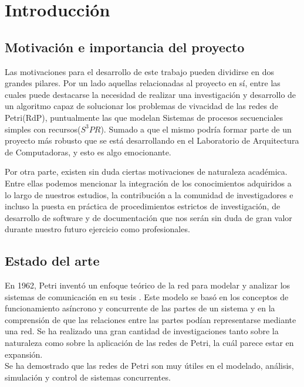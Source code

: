 
\chapter{Introducción} %

\label{Chapter1} %

\section{Motivación e importancia del proyecto}

Las motivaciones para el desarrollo de este trabajo pueden dividirse en dos grandes pilares. Por un lado aquellas relacionadas al proyecto en sí, entre las cuales puede destacarse la necesidad de realizar una investigación y desarrollo de un algoritmo capaz de solucionar los problemas de vivacidad de las redes de Petri(RdP), puntualmente las que modelan Sistemas de procesos secuenciales simples con recursos($S^3PR$). Sumado a que el mismo podría formar parte de un proyecto más robusto que se está desarrollando en el Laboratorio de Arquitectura de Computadoras, y esto es algo emocionante.
\bigskip 

Por otra parte, existen sin duda ciertas motivaciones de naturaleza académica. Entre ellas podemos mencionar la integración de los conocimientos adquiridos a lo largo de nuestros estudios, la contribución a la comunidad de investigadores e incluso la puesta en práctica de procedimientos estrictos de investigación, de desarrollo de software y de documentación que nos serán sin duda de gran valor durante nuestro futuro ejercicio como profesionales.

\section{Estado del arte}

En 1962, Petri inventó un enfoque teórico de la red para modelar y analizar los sistemas de comunicación en su tesis \cite{petri1962kommunikation}. Este modelo se basó en los conceptos de funcionamiento asíncrono y concurrente de las partes de un sistema y en la comprensión de que las relaciones entre las partes podían representarse mediante una red. Se ha realizado una gran cantidad de investigaciones tanto sobre la naturaleza como sobre la aplicación de las redes de Petri, la cuál parece estar en expansión.\\
Se ha demostrado que las redes de Petri son muy útiles en el modelado, análisis, simulación y control de sistemas concurrentes.

